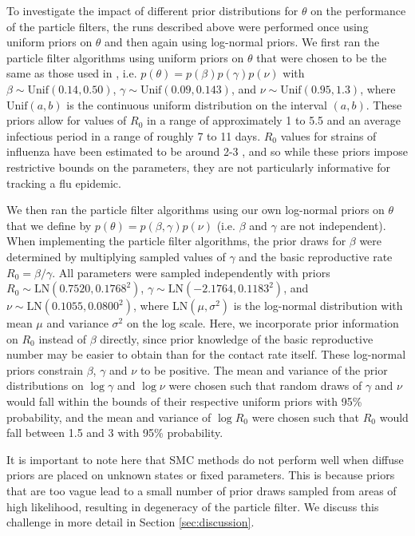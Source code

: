 \documentclass{elsarticle}
\begin{document}
To investigate the impact of different prior distributions for $\theta$ on the performance of the particle filters, the runs described above were performed once using uniform priors on $\theta$ and then again using log-normal priors. We first ran the particle filter algorithms using uniform priors on $\theta$ that were chosen to be the same as those used in \citet{skvortsov2012monitoring}, i.e. $p(\theta) = p(\beta)p(\gamma)p(\nu)$ with $\beta\sim \mbox{Unif}(0.14, 0.50)$, $\gamma\sim\mbox{Unif}(0.09, 0.143)$, and $\nu\sim \mbox{Unif}(0.95, 1.3)$, where $\mbox{Unif}(a, b)$ is the continuous uniform distribution on the interval $(a,b)$. These priors allow for values of $R_0$ in a range of approximately 1 to 5.5 and an average infectious period in a range of roughly 7 to 11 days. $R_0$ values for strains of influenza have been estimated to be around 2-3 \citep{mills2004influenza, heff2005repratio, zhang2011flu}, and so while these priors impose restrictive bounds on the parameters, they are not particularly informative for tracking a flu epidemic.

We then ran the particle filter algorithms using our own log-normal priors on $\theta$ that we define by $p(\theta) = p(\beta, \gamma)p(\nu)$ (i.e. $\beta$ and $\gamma$ are not independent). When implementing the particle filter algorithms, the prior draws for $\beta$ were determined by multiplying sampled values of $\gamma$ and the basic reproductive rate $R_0 = \beta / \gamma$. All parameters were sampled independently with priors $R_0\sim \mbox{LN}(0.7520, 0.1768^2)$, $\gamma\sim \mbox{LN}(-2.1764, 0.1183^2)$, and $\nu\sim \mbox{LN}(0.1055, 0.0800^2)$, where $\mbox{LN}(\mu, \sigma^2)$ is the log-normal distribution with mean $\mu$ and variance $\sigma^2$ on the log scale. Here, we incorporate prior information on $R_0$ instead of $\beta$ directly, since prior knowledge of the basic reproductive number may be easier to obtain than for the contact rate itself. These log-normal priors constrain $\beta$, $\gamma$ and $\nu$ to be positive. The mean and variance of the prior distributions on $\log \gamma$ and $\log \nu$ were chosen such that random draws of $\gamma$ and $\nu$ would fall within the bounds of their respective uniform priors with 95\% probability, and the mean and variance of $\log R_0$ were chosen such that $R_0$ would fall between 1.5 and 3 with 95\% probability.

It is important to note here that SMC methods do not perform well when diffuse priors are placed on unknown states or fixed parameters. This is because priors that are too vague lead to a small number of prior draws sampled from areas of high likelihood, resulting in degeneracy of the particle filter. We discuss this challenge in more detail in Section \ref{sec:discussion}.
\end{document}
